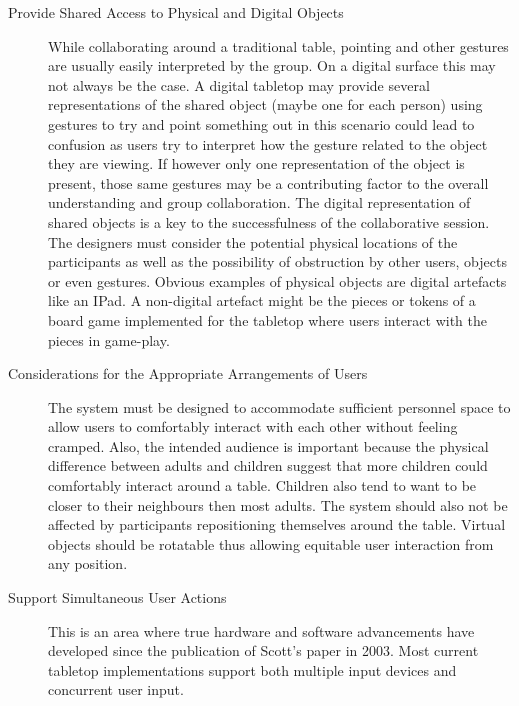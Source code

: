 \documentclass[lnbip,sechang,a4paper]{svmultln}
\begin{document}
\begin{description}
\item[Provide Shared Access to Physical and Digital Objects] While
  collaborating around a traditional table, pointing and other
  gestures are usually easily interpreted by the group. On a digital
  surface this may not always be the case. A digital tabletop may
  provide several representations of the shared object (maybe one for
  each person) using gestures to try and point something out in this
  scenario could lead to confusion as users try to interpret how the
  gesture related to the object they are viewing. If however only one
  representation of the object is present, those same gestures may be
  a contributing factor to the overall understanding and group
  collaboration. The digital representation of shared objects is a key
  to the successfulness of the collaborative session. The designers
  must consider the potential physical locations of the participants
  as well as the possibility of obstruction by other users, objects or
  even gestures. Obvious examples of physical objects are digital
  artefacts like an IPad. A non-digital artefact might be the pieces
  or tokens of a board game implemented for the tabletop where users
  interact with the pieces in game-play.

\item[Considerations for the Appropriate Arrangements of Users] The
  system must be designed to accommodate sufficient personnel space to
  allow users to comfortably interact with each other without feeling
  cramped. Also, the intended audience is important because the
  physical difference between adults and children suggest that more
  children could comfortably interact around a table. Children also
  tend to want to be closer to their neighbours then most
  adults\cite{Aiello}. The system should also not be affected by
  participants repositioning themselves around the table. Virtual
  objects should be rotatable thus allowing equitable user interaction
  from any position.

\item[Support Simultaneous User Actions] This is an area where true
  hardware and software advancements have developed since the
  publication of Scott's paper in 2003. Most current tabletop
  implementations support both multiple input devices and concurrent
  user input.
\end{description}
\end{document}
